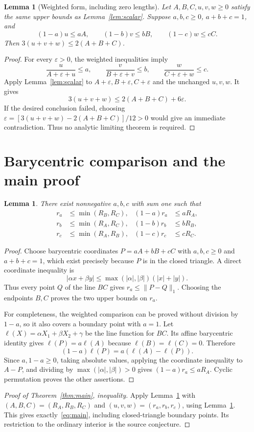 \documentclass[11pt]{article}
\newtheorem{lemma}[theorem]{Lemma}
\newcommand{\abs}[1]{\lvert#1\rvert}
\newcommand{\norm}[1]{\lVert#1\rVert_1}
\begin{document}
\begin{lemma}[Weighted form, including zero lengths]\label{lem:weighted}
Let $A,B,C,u,v,w\ge0$ satisfy the same upper bounds as Lemma~\ref{lem:scalar}. Suppose $a,b,c\ge0$, $a+b+c=1$, and
\[
 (1-a)u\le aA,\qquad(1-b)v\le bB,\qquad(1-c)w\le cC.
\]
Then $3(u+v+w)\le2(A+B+C)$.
\end{lemma}
\begin{proof}
For every $\varepsilon>0$, the weighted inequalities imply
\[
 \frac{u}{A+\varepsilon+u}\le a,\qquad
 \frac{v}{B+\varepsilon+v}\le b,\qquad
 \frac{w}{C+\varepsilon+w}\le c.
\]
Apply Lemma~\ref{lem:scalar} to $A+\varepsilon,B+\varepsilon,C+\varepsilon$ and the unchanged $u,v,w$. It gives
\[
 3(u+v+w)\le2(A+B+C)+6\varepsilon.
\]
If the desired conclusion failed, choosing $\varepsilon=[3(u+v+w)-2(A+B+C)]/12>0$ would give an immediate contradiction. Thus no analytic limiting theorem is required.
\end{proof}

\section{Barycentric comparison and the main proof}
\begin{lemma}\label{lem:geometry}
There exist nonnegative $a,b,c$ with sum one such that
\begin{align*}
 r_a&\le\min(R_B,R_C), &(1-a)r_a&\le aR_A,\\
 r_b&\le\min(R_A,R_C), &(1-b)r_b&\le bR_B,\\
 r_c&\le\min(R_A,R_B), &(1-c)r_c&\le cR_C.
\end{align*}
\end{lemma}
\begin{proof}
Choose barycentric coordinates $P=aA+bB+cC$ with $a,b,c\ge0$ and $a+b+c=1$, which exist precisely because $P$ is in the closed triangle. A direct coordinate inequality is
\[
 \abs{\alpha x+\beta y}\le\max(\abs\alpha,\abs\beta)(\abs x+\abs y).
\]
Thus every point $Q$ of the line $BC$ gives $r_a\le\norm{P-Q}$. Choosing the endpoints $B,C$ proves the two upper bounds on $r_a$.

For completeness, the weighted comparison can be proved without division by $1-a$, so it also covers a boundary point with $a=1$. Let $\ell(X)=\alpha X_1+\beta X_2+\gamma$ be the line function for $BC$. Its affine barycentric identity gives $\ell(P)=a\ell(A)$ because $\ell(B)=\ell(C)=0$. Therefore
\[
 (1-a)\ell(P)=a(\ell(A)-\ell(P)).
\]
Since $a,1-a\ge0$, taking absolute values, applying the coordinate inequality to $A-P$, and dividing by $\max(\abs\alpha,\abs\beta)>0$ gives $(1-a)r_a\le aR_A$. Cyclic permutation proves the other assertions.
\end{proof}
\begin{proof}[Proof of Theorem~\ref{thm:main}, inequality]
Apply Lemma~\ref{lem:weighted} with $(A,B,C)=(R_A,R_B,R_C)$ and $(u,v,w)=(r_a,r_b,r_c)$, using Lemma~\ref{lem:geometry}. This gives exactly~\eqref{eq:main}, including closed-triangle boundary points. Its restriction to the ordinary interior is the source conjecture.
\end{proof}
\end{document}

